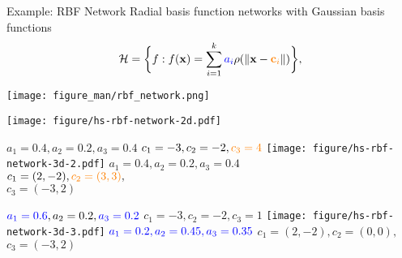 \documentclass[11pt,compress,t,notes=noshow, xcolor=table]{beamer}
\begin{document}
\begin{vbframe}{Example: RBF Network}
  Radial basis function networks with Gaussian basis functions
$$\mathcal{H} = \bigg\{ f: f(\mathbf{x}) =  \sum\limits_{i=1}^k \textcolor{blue}{a_i} \rho ( \| \mathbf{x} - 
  \textcolor{orange}{\textbf{c}_i}  \|) 
  \bigg\},$$ 
  
  {
  \centering
  \texttt{[image: figure\_man/rbf\_network.png]}
  }
  \framebreak
  
  \begin{center}
    \texttt{[image: figure/hs-rbf-network-2d.pdf]}
  \end{center}
  \vspace{-2em}
  \tiny
  {
  \begin{center}
    $a_1 = 0.4, a_2 = 0.2, a_3 = 0.4$
    $c_1 = -3, c_2 = -2, \textcolor{orange}{c_3 = 4}$
    \texttt{[image: figure/hs-rbf-network-3d-2.pdf]}
    $a_1 = 0.4, a_2 = 0.2, a_3 = 0.4$ \\
    $c_1 = (2,-2), \textcolor{orange}{c_2 = (3,3)},$ \\
    $c_3 = (-3,2)$
  \end{center}
  }
  {
  \begin{center}
    $\textcolor{blue}{a_1 = 0.6}, a_2 = 0.2, \textcolor{blue}{a_3 = 0.2}$
    $c_1 = -3, c_2 = -2, c_3 = 1$
    \texttt{[image: figure/hs-rbf-network-3d-3.pdf]}
    $\textcolor{blue}{a_1 = 0.2, a_2 = 0.45, a_3 = 0.35}$
    $c_1 = (2,-2), c_2 = (0,0),$ \\
    $c_3 = (-3,2)$
  \end{center}
  }
  \normalsize
  
\end{vbframe}

\endlecture
\end{document}
